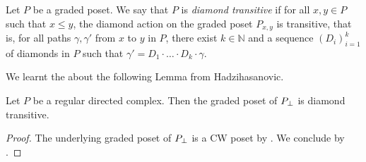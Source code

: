 \begin{dfn} 
    Let \( P \) be a graded poset.
    We say that \( P \) is \emph{diamond transitive} if for all \( x, y \in P \) such that \( x \le y \), the diamond action on the graded poset \( P_{x, y} \) is transitive, that is, for all paths \( \gamma, \gamma' \) from \( x \) to \( y \) in \( P \), there exist \( k \in \mathbb{N} \) and a sequence \( (D_i)_{i = 1}^k \) of diamonds in \( P \) such that \( \gamma' = D_1 \cdot \ldots \cdot D_k \cdot \gamma \).
\end{dfn}

\noindent We learnt the about the following Lemma from Hadzihasanovic.
\begin{lem} \label{lem:diamond_transitive}
    Let \( P \) be a regular directed complex.
    Then the graded poset of \( {{P}_\bot} \) is diamond transitive.
\end{lem}
\begin{proof}
    The underlying graded poset of \( {{P}_\bot} \) is a CW poset by \cite[Corollary 10.3.3]{hadzihasanovic2024combinatorics}.
    We conclude by \cite[Theorem 5.14]{chandler2019thin}.
\end{proof}

